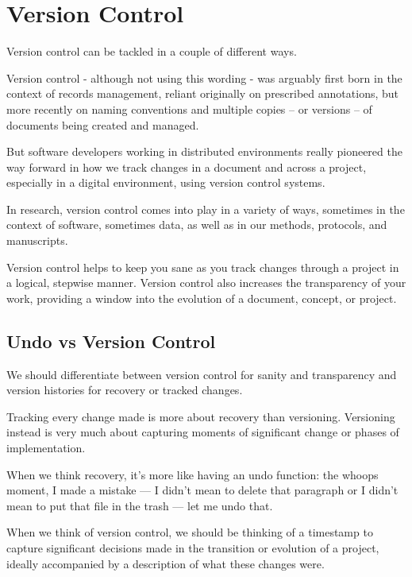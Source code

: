 \documentclass[
]{book}
\begin{document}
\hypertarget{version-control-1}{%
\chapter*{Version Control}\label{version-control-1}}

Version control can be tackled in a couple of different ways.

Version control - although not using this wording - was arguably first born in the context of records management, reliant originally on prescribed annotations, but more recently on naming conventions and multiple copies -- or versions -- of documents being created and managed.

But software developers working in distributed environments really pioneered the way forward in how we track changes in a document and across a project, especially in a digital environment, using version control systems.

In research, version control comes into play in a variety of ways, sometimes in the context of software, sometimes data, as well as in our methods, protocols, and manuscripts.

Version control helps to keep you sane as you track changes through a project in a logical, stepwise manner. Version control also increases the transparency of your work, providing a window into the evolution of a document, concept, or project.

\hypertarget{undo-vs-version-control}{%
\section*{Undo vs Version Control}\label{undo-vs-version-control}}

We should differentiate between version control for sanity and transparency and version histories for recovery or tracked changes.

Tracking every change made is more about recovery than versioning. Versioning instead is very much about capturing moments of significant change or phases of implementation.

When we think recovery, it's more like having an undo function: the whoops moment, I made a mistake --- I didn't mean to delete that paragraph or I didn't mean to put that file in the trash --- let me undo that.

When we think of version control, we should be thinking of a timestamp to capture significant decisions made in the transition or evolution of a project, ideally accompanied by a description of what these changes were.
\end{document}
